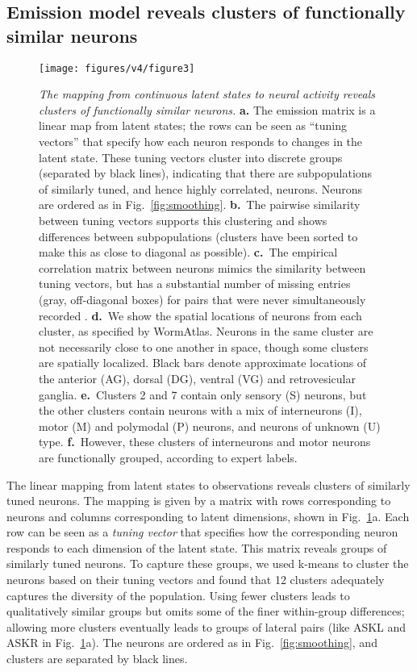 \documentclass[11pt]{article}
\begin{document}
\subsection*{Emission model reveals clusters of functionally similar neurons}

\begin{figure}[t!]
\centering
\texttt{[image: figures/v4/figure3]} 
\caption{ \textit{The mapping from continuous latent states to neural
    activity reveals clusters of functionally similar neurons.}
  \textbf{a.} The emission matrix is a linear map from latent states;
  the rows can be seen as ``tuning vectors'' that specify how each
  neuron responds to changes in the latent state.  These tuning
  vectors cluster into discrete groups (separated by black lines),
  indicating that there are subpopulations of similarly tuned, and
  hence highly correlated, neurons. Neurons are ordered as in
  Fig.~\ref{fig:smoothing}. \textbf{b.}~The pairwise similarity
  between tuning vectors supports this clustering and shows
  differences between subpopulations (clusters have been sorted to
  make this as close to diagonal as possible).  \textbf{c.}~The
  empirical correlation matrix between neurons mimics the similarity
  between tuning vectors, but has a substantial number of missing
  entries (gray, off-diagonal boxes) for pairs that were never
  simultaneously recorded .  \textbf{d.}~We show the spatial locations
  of neurons from each cluster, as specified by WormAtlas.  Neurons in
  the same cluster are not necessarily close to one another in space,
  though some clusters are spatially localized. Black bars denote
  approximate locations of the anterior (AG), dorsal (DG), ventral
  (VG) and retrovesicular ganglia.  \textbf{e.}~Clusters 2 and 7
  contain only sensory (S) neurons, but the other clusters contain
  neurons with a mix of interneurons (I), motor (M) and polymodal (P) neurons, and
  neurons of unknown (U) type. \textbf{f.}~However, these clusters of
  interneurons and motor neurons are functionally grouped, according
  to expert labels. }
\label{fig:clustering}
\end{figure}


The linear mapping from latent states to observations reveals clusters
of similarly tuned neurons.  The mapping is given by a matrix with
rows corresponding to neurons and columns corresponding to latent
dimensions, shown in Fig.~\ref{fig:clustering}a.  Each row can be seen
as a \emph{tuning vector} that specifies how the corresponding neuron
responds to each dimension of the latent state.  This matrix reveals
groups of similarly tuned neurons. To capture these groups, we used
k-means to cluster the neurons based on their tuning vectors and found
that 12 clusters adequately captures the diversity of the population.
Using fewer clusters leads to qualitatively similar groups but omits
some of the finer within-group differences; allowing more clusters
eventually leads to groups of lateral pairs (like \textsf{ASKL} and
\textsf{ASKR} in Fig.~\ref{fig:clustering}a).  The neurons are ordered
as in Fig.~\ref{fig:smoothing}, and clusters are separated by black
lines.
\end{document}
